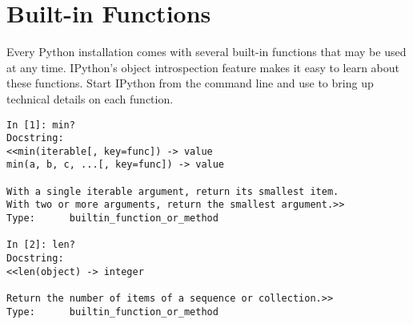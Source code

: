 \label{lab:Standard Library}

\section*{Built-in Functions} %

Every Python installation comes with several built-in functions that may be used at any time.
IPython's object introspection feature makes it easy to learn about these functions.
Start IPython from the command line and use  to bring up technical details on each function.

\begin{lstlisting}
In [1]: min?
Docstring:
<<min(iterable[, key=func]) -> value
min(a, b, c, ...[, key=func]) -> value

With a single iterable argument, return its smallest item.
With two or more arguments, return the smallest argument.>>
Type:      builtin_function_or_method

In [2]: len?
Docstring:
<<len(object) -> integer

Return the number of items of a sequence or collection.>>
Type:      builtin_function_or_method
\end{lstlisting}

